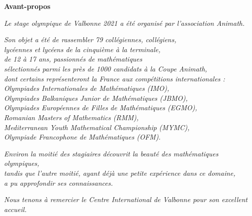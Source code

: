 
\begin{flushright}

\textbf{\Large{Avant-propos}}

\bigskip

\emph{Le stage olympique de Valbonne 2021 a été organisé par l'association Animath.}

\bigskip

\emph{Son objet a été de rassembler 79 collégiennes, collégiens,\\
lycéennes et lycéens de la cinquième à la terminale, \\
de 12 à 17 ans, passionnés de mathématiques \\
sélectionnés parmi les près de 1000 candidats à la Coupe Animath, \\
dont certains représenteront la France aux compétitions internationales : \\
Olympiades Internationales de Mathématiques (IMO), \\
Olympiades Balkaniques Junior de Mathématiques (JBMO), \\
Olympiades Européennes de Filles de Mathématiques (EGMO), \\
Romanian Masters of Mathematics (RMM), \\
Mediterranean Youth Mathematical Championship (MYMC), \\
Olympiade Francophone de Mathématiques (OFM).}

\bigskip

\emph{Environ la moitié des stagiaires découvrit la beauté des mathématiques olympiques, \\
tandis que l'autre moitié, ayant déjà une petite expérience dans ce domaine, \\
a pu approfondir ses connaissances.}

\vspace{3cm}

\emph{Nous tenons à remercier le Centre International de Valbonne pour son excellent accueil.}
\end{flushright}



